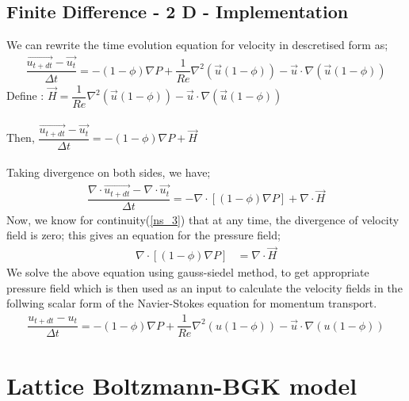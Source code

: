 \documentclass[12pt,a4paper]{report}
\begin{document}
\subsection{Finite Difference - 2 D - Implementation}
We can rewrite the time evolution equation for 
velocity in descretised form as;
\begin{align}
	\dfrac{\vec{u_{t+dt}} - \vec{u_t}}{\Delta t} = -(1-\phi)\nabla P + \dfrac{1}{Re}\nabla^2\left(\vec{u}(1-\phi)\right) - \vec{u}\cdot\nabla\left(\vec{u}(1-\phi)\right) 
\end{align}
Define : $\vec{H} = \dfrac{1}{Re}\nabla^2\left(\vec{u}(1-\phi)\right) - \vec{u}\cdot\nabla\left(\vec{u}(1-\phi)\right)$\\
\\
Then,
$
	\dfrac{\vec{u_{t+dt}} - \vec{u_t}}{\Delta t} = -(1-\phi)\nabla P + \vec{H}
$\\
\\
Taking divergence on both sides, we have;
\begin{align}
	\dfrac{\nabla\cdot\vec{u_{t+dt}} - \nabla\cdot\vec{u_t}}{\Delta t} = -\nabla\cdot\left[(1-\phi)\nabla P\right] + \nabla\cdot\vec{H}	
\end{align}
Now, we know for continuity(\ref{ns_3}) that at any time,
the divergence of velocity field is zero; this gives an 
equation for the pressure field;
\begin{align}
	\nabla\cdot\left[(1-\phi)\nabla P\right] &= \nabla\cdot\vec{H} 
\end{align}
We solve the above equation using gauss-siedel method, to get 
appropriate pressure field which is then used as an input to 
calculate the velocity fields in the follwing scalar form of 
the Navier-Stokes equation for momentum transport.
\begin{align}
	\dfrac{u_{t+dt} - u_t}{\Delta t} = -(1-\phi)\nabla P + \dfrac{1}{Re}\nabla^2\left(u(1-\phi)\right) - \vec{u}\cdot\nabla\left(u(1-\phi)\right) 
\end{align}
\section{Lattice Boltzmann-BGK model}
\end{document}
